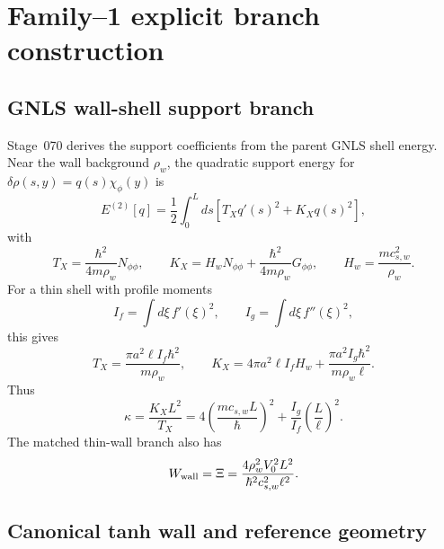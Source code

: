 \section{Family--1 explicit branch construction}
\label{sec:part03_support_family1:family-1-explicit-branch-construction}

\subsection{GNLS wall-shell support branch}
\label{subsec:part03-wall-shell}

Stage~070 derives the support coefficients from the parent GNLS shell energy.  Near the wall background \(\rho_w\), the quadratic support energy for \(\delta\rho(s,y)=q(s)\chi_\phi(y)\) is
\begin{equation}
\label{eq:part03-E2-support}
E^{(2)}[q]=\frac12\int_0^Lds\left[T_Xq'(s)^2+K_Xq(s)^2\right],
\end{equation}
with
\begin{equation}
\label{eq:part03-TX-KX-shell}
T_X=\frac{\hbar^2}{4m\rho_w}N_{\phi\phi},
\qquad
K_X=H_wN_{\phi\phi}+\frac{\hbar^2}{4m\rho_w}G_{\phi\phi},
\qquad
H_w=\frac{mc_{s,w}^2}{\rho_w}.
\end{equation}
For a thin shell with profile moments
\begin{equation}
\label{eq:part03-If-Ig-general}
I_f=\int d\xi\,f'(\xi)^2,
\qquad
I_g=\int d\xi\,f''(\xi)^2,
\end{equation}
this gives
\begin{equation}
\label{eq:part03-TX-KX-thin-shell}
T_X=\frac{\pi a^2\ell I_f\hbar^2}{m\rho_w},
\qquad
K_X=4\pi a^2\ell I_fH_w+\frac{\pi a^2I_g\hbar^2}{m\rho_w\ell}.
\end{equation}
Thus
\begin{equation}
\label{eq:part03-kappa-shell}
\kappa=\frac{K_XL^2}{T_X}
=4\left(\frac{mc_{s,w}L}{\hbar}\right)^2+\frac{I_g}{I_f}\left(\frac{L}{\ell}\right)^2.
\end{equation}
The matched thin-wall branch also has
\begin{equation}
\label{eq:part03-Wwall-Xi}
W_{\rm wall}=\Xi
=\frac{4\rho_w^2V_0^2L^2}{\hbar^2c_{s,w}^2\ell^2}.
\end{equation}

\subsection{Canonical tanh wall and reference geometry}
\label{subsec:part03-tanh-reference}

